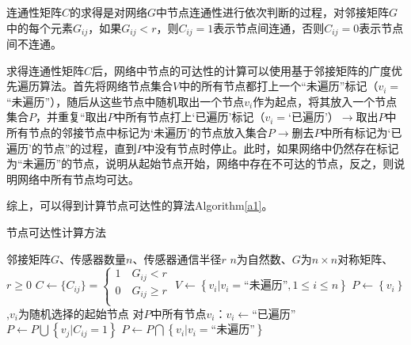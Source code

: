 \documentclass[a4paper]{ctexart}
\begin{document}
\begin{spacing}{1}
	连通性矩阵$C$的求得是对网络$G$中节点连通性进行依次判断的过程，对邻接矩阵$G$中的每个元素$G_{ij}$，如果$G_{ij}<r$，则$C_{ij}=1$表示节点间连通，否则$C_{ij}=0$表示节点间不连通。

	求得连通性矩阵$C$后，网络中节点的可达性的计算可以使用基于邻接矩阵的广度优先遍历算法。首先将网络节点集合$V$中的所有节点都打上一个“未遍历”标记（$v_i=$“未遍历”），随后从这些节点中随机取出一个节点$v_i$作为起点，将其放入一个节点集合$P$，并重复“取出$P$中所有节点打上‘已遍历’标记（$v_i=$‘已遍历’）$\rightarrow$取出$P$中所有节点的邻接节点中标记为‘未遍历’的节点放入集合$P$$\rightarrow$删去$P$中所有标记为‘已遍历’的节点”的过程，直到$P$中没有节点时停止。此时，如果网络中仍然存在标记为“未遍历”的节点，说明从起始节点开始，网络中存在不可达的节点，反之，则说明网络中所有节点均可达。

		综上，可以得到计算节点可达性的算法Algorithm\ref{a1}。

		\begin{algorithm}[htbp]
			\caption{节点可达性计算方法}
			\label{a1}
			\begin{algorithmic}[1]
				\Require 邻接矩阵$G$、传感器数量$n$、传感器通信半径$r$
				\Ensure $n$为自然数、$G$为$n\times n$对称矩阵、$r\ge 0$
				\State $C\gets \{C_{ij}\}=\left\{
					\begin{array}{r}
						1\quad G_{ij}<r    \\
						0\quad G_{ij}\ge r \\
					\end{array}\right.$
				\State $V\gets \left\{v_i|v_i=\text{“未遍历”},1\le i\le n\right\}$
				\State $P\gets\left\{v_i\right\}$,$v_i$为随机选择的起始节点
				\State 对$P$中所有节点$v_i$：$v_i\gets\text{“已遍历”}$
				\State $P\gets P\bigcup \left\{v_j|C_{ij}=1\right\}$
				\EndFor
				\State $P\gets P\bigcap\left\{v_i|v_i=\text{“未遍历”}\right\}$
				\EndWhile
				\State {}
				\EndIf
				\State {}
				\EndFunction
			\end{algorithmic}
		\end{algorithm}


\end{spacing}
\end{document}
